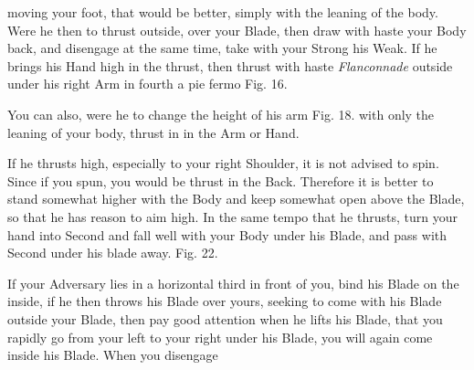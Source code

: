 \newpage


\newpage


moving your foot, that would be better, simply with the leaning of the
body. Were he then to thrust outside, over your Blade, then draw with
haste your Body back, and disengage at the same time, take with your
Strong his Weak. If he brings his Hand high in the thrust, then thrust
with haste {\it Flanconnade} outside under his right Arm in fourth a pie
fermo Fig. 16.

\exercise{}

You can also, were he to change the height of his arm Fig. 18. with
only the leaning of your body, thrust in in the Arm or Hand.

\exercise{}


If he thrusts high, especially to your right Shoulder, it is not
advised to spin. Since if you spun, you would be thrust in the
Back. Therefore it is better to stand somewhat higher with the Body
and keep somewhat open above the Blade, so that he has reason to aim
high. In the same tempo that he thrusts, turn your hand into Second
and fall well with your Body under his Blade, and pass with Second
under his blade away. Fig. 22.

\exercise{}


If your Adversary lies in a horizontal third in front of you, bind his
Blade on the inside, if he then throws his Blade over yours, seeking
to come with his Blade outside your Blade, then pay good attention
when he lifts his Blade, that you rapidly go from your left to your
right under his Blade, you will again come inside his Blade. When you
disengage
